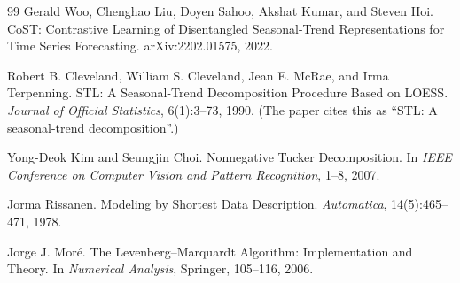 \begin{thebibliography}{99}
Gerald Woo, Chenghao Liu, Doyen Sahoo, Akshat Kumar, and Steven Hoi.
\newblock CoST: Contrastive Learning of Disentangled Seasonal-Trend Representations for Time Series Forecasting.
\newblock arXiv:2202.01575, 2022.

Robert B. Cleveland, William S. Cleveland, Jean E. McRae, and Irma Terpenning.
\newblock STL: A Seasonal-Trend Decomposition Procedure Based on LOESS.
\newblock \emph{Journal of Official Statistics}, 6(1):3--73, 1990.
\newblock (The paper cites this as ``STL: A seasonal-trend decomposition''.)

Yong-Deok Kim and Seungjin Choi.
\newblock Nonnegative Tucker Decomposition.
\newblock In \emph{IEEE Conference on Computer Vision and Pattern Recognition}, 1--8, 2007.

Jorma Rissanen.
\newblock Modeling by Shortest Data Description.
\newblock \emph{Automatica}, 14(5):465--471, 1978.

Jorge J. Mor\'e.
\newblock The Levenberg--Marquardt Algorithm: Implementation and Theory.
\newblock In \emph{Numerical Analysis}, Springer, 105--116, 2006.

\end{thebibliography}

\begin{keypoint}
\end{keypoint}
